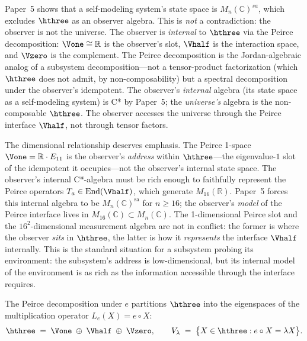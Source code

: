 \begin{remark}\label{rem:observer-universe}
Paper~5 shows that a self-modeling system's state space is
$M_n(\mathbb{C})^{sa}$, which excludes $\hthree$ as an observer
algebra.  This is \emph{not} a contradiction: the observer is not
the universe.  The observer is \emph{internal} to $\hthree$ via the
Peirce decomposition: $\Vone \cong \mathbb{R}$ is the observer's
slot, $\Vhalf$ is the interaction space, and $\Vzero$ is the
complement.  The Peirce decomposition is the Jordan-algebraic analog
of a subsystem decomposition---not a tensor-product factorization
(which $\hthree$ does not admit, by non-composability) but a
spectral decomposition under the observer's idempotent.  The
observer's \emph{internal} algebra (its state space as a
self-modeling system) is C* by Paper~5; the \emph{universe's}
algebra is the non-composable $\hthree$.  The observer accesses the
universe through the Peirce interface $\Vhalf$, not through tensor
factors.

The dimensional relationship deserves emphasis.  The Peirce 1-space
$\Vone = \mathbb{R}\cdot E_{11}$ is the observer's \emph{address}
within $\hthree$---the eigenvalue-$1$ slot of the idempotent it
occupies---not the observer's internal state space.  The observer's
internal C*-algebra must be rich enough to faithfully represent the
Peirce operators $T_a \in \mathrm{End}(\Vhalf)$, which generate
$M_{16}(\mathbb{R})$.  Paper~5 forces this internal algebra to be
$M_n(\mathbb{C})^{\mathrm{sa}}$ for $n \geq 16$; the observer's
\emph{model} of the Peirce interface lives in
$M_{16}(\mathbb{C}) \subset M_n(\mathbb{C})$.  The 1-dimensional
Peirce slot and the $16^2$-dimensional measurement algebra are not
in conflict: the former is where the observer \emph{sits} in
$\hthree$, the latter is how it \emph{represents} the interface
$\Vhalf$ internally.  This is the standard situation for a subsystem
probing its environment: the subsystem's address is low-dimensional,
but its internal model of the environment is as rich as the
information accessible through the interface requires.
\end{remark}

The Peirce decomposition under $e$ partitions $\hthree$ into the
eigenspaces of the multiplication operator $L_e(X) = e \circ X$:
\begin{equation}\label{eq:peirce-decomp}
  \hthree \;=\; \Vone \;\oplus\; \Vhalf \;\oplus\; \Vzero,
  \qquad
  V_\lambda \;=\; \bigl\{X \in \hthree : e \circ X = \lambda X\bigr\}.
\end{equation}

